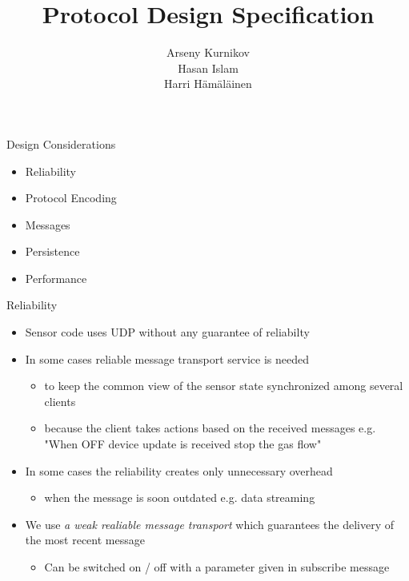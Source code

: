 \documentclass{beamer}
\title{Protocol Design Specification}
\author{Arseny Kurnikov\\
Hasan Islam\\
Harri Hämäläinen}
\begin{document}
\begin{frame}
\titlepage
\end{frame}


\begin{frame}{Design Considerations}
    \begin{itemize}
        \item Reliability
        \item Protocol Encoding
        \item Messages
        \item Persistence 
        \item Performance
    \end{itemize}
\end{frame}

\begin{frame}{Reliability}
    \begin{itemize}
        \item Sensor code uses UDP without any guarantee of reliabilty
        \item In some cases reliable message transport service is needed 
            \begin{itemize}
                \item to keep the common view of the sensor state synchronized
                among several clients
                \item because the client takes actions based on the received
                messages e.g. "When OFF device update is received stop the
                gas flow"
            \end{itemize}
        \item In some cases the reliability creates only unnecessary overhead
            \begin{itemize}
                \item when the message is soon outdated e.g. data streaming
            \end{itemize}
        \item We use \textit{a weak realiable message transport} which
        guarantees the delivery of the most recent message
            \begin{itemize}
                \item Can be switched on / off with a parameter given in
                subscribe message
            \end{itemize}

    \end{itemize}
\end{frame}
\end{document}
